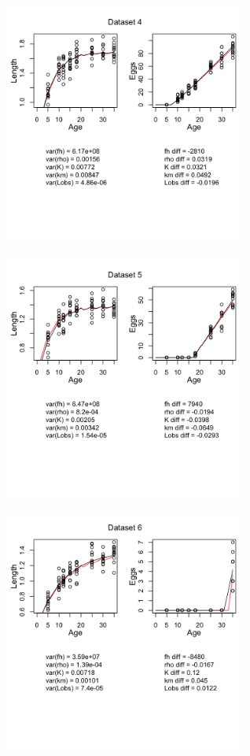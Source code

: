 \documentclass[12pt,reqno,final,pdftex]{amsart}\usepackage[]{graphicx}\usepackage[]{color}
\newenvironment{knitrout}{}{} %
\theoremstyle{plain}
\numberwithin{equation}{part}
\begin{document}
\begin{knitrout}
\includegraphics[width=0.6\textwidth]{figure/unnamed-chunk-5-4} \hfill{}




\includegraphics[width=0.6\textwidth]{figure/unnamed-chunk-5-5} \hfill{}




\includegraphics[width=0.6\textwidth]{figure/unnamed-chunk-5-6} \hfill{}





\end{knitrout}
\end{document}
